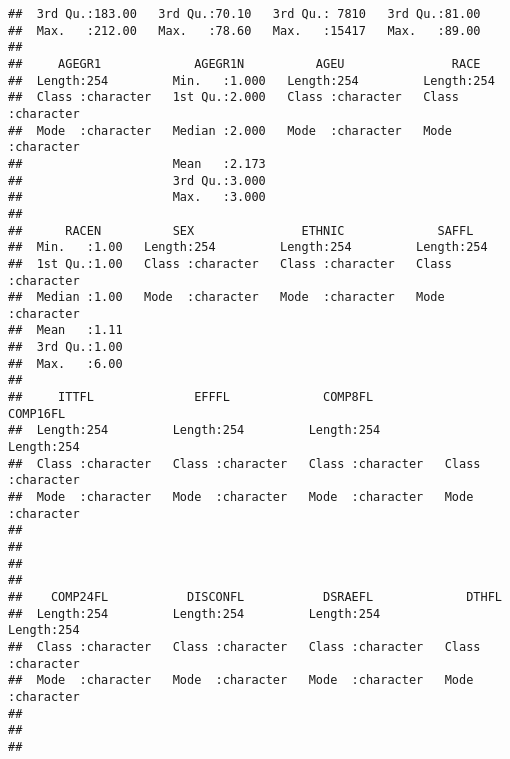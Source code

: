 \documentclass[]{book}
\begin{document}
\begin{verbatim}
##  3rd Qu.:183.00   3rd Qu.:70.10   3rd Qu.: 7810   3rd Qu.:81.00  
##  Max.   :212.00   Max.   :78.60   Max.   :15417   Max.   :89.00  
##                                                                  
##     AGEGR1             AGEGR1N          AGEU               RACE          
##  Length:254         Min.   :1.000   Length:254         Length:254        
##  Class :character   1st Qu.:2.000   Class :character   Class :character  
##  Mode  :character   Median :2.000   Mode  :character   Mode  :character  
##                     Mean   :2.173                                        
##                     3rd Qu.:3.000                                        
##                     Max.   :3.000                                        
##                                                                          
##      RACEN          SEX               ETHNIC             SAFFL          
##  Min.   :1.00   Length:254         Length:254         Length:254        
##  1st Qu.:1.00   Class :character   Class :character   Class :character  
##  Median :1.00   Mode  :character   Mode  :character   Mode  :character  
##  Mean   :1.11                                                           
##  3rd Qu.:1.00                                                           
##  Max.   :6.00                                                           
##                                                                         
##     ITTFL              EFFFL             COMP8FL            COMP16FL        
##  Length:254         Length:254         Length:254         Length:254        
##  Class :character   Class :character   Class :character   Class :character  
##  Mode  :character   Mode  :character   Mode  :character   Mode  :character  
##                                                                             
##                                                                             
##                                                                             
##                                                                             
##    COMP24FL           DISCONFL           DSRAEFL             DTHFL          
##  Length:254         Length:254         Length:254         Length:254        
##  Class :character   Class :character   Class :character   Class :character  
##  Mode  :character   Mode  :character   Mode  :character   Mode  :character  
##                                                                             
##                                                                             
##                                                                             

\end{verbatim}
\end{document}
